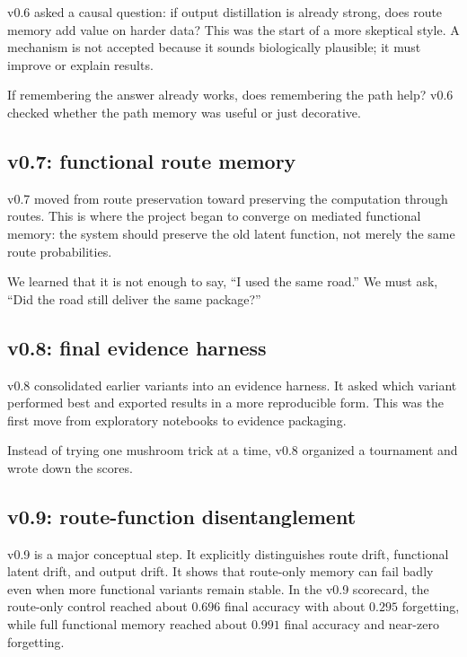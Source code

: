 \documentclass[11pt]{article}
\begin{document}
v0.6 asked a causal question: if output distillation is already strong, does route memory add value on harder data? This was the start of a more skeptical style. A mechanism is not accepted because it sounds biologically plausible; it must improve or explain results.

\begin{kidbox}
If remembering the answer already works, does remembering the path help? v0.6 checked whether the path memory was useful or just decorative.
\end{kidbox}

\subsection{v0.7: functional route memory}

v0.7 moved from route preservation toward preserving the computation through routes. This is where the project began to converge on mediated functional memory: the system should preserve the old latent function, not merely the same route probabilities.

\begin{kidbox}
We learned that it is not enough to say, ``I used the same road.'' We must ask, ``Did the road still deliver the same package?''
\end{kidbox}

\subsection{v0.8: final evidence harness}

v0.8 consolidated earlier variants into an evidence harness. It asked which variant performed best and exported results in a more reproducible form. This was the first move from exploratory notebooks to evidence packaging.

\begin{kidbox}
Instead of trying one mushroom trick at a time, v0.8 organized a tournament and wrote down the scores.
\end{kidbox}

\subsection{v0.9: route-function disentanglement}

v0.9 is a major conceptual step. It explicitly distinguishes route drift, functional latent drift, and output drift. It shows that route-only memory can fail badly even when more functional variants remain stable. In the v0.9 scorecard, the route-only control reached about $0.696$ final accuracy with about $0.295$ forgetting, while full functional memory reached about $0.991$ final accuracy and near-zero forgetting.
\end{document}

